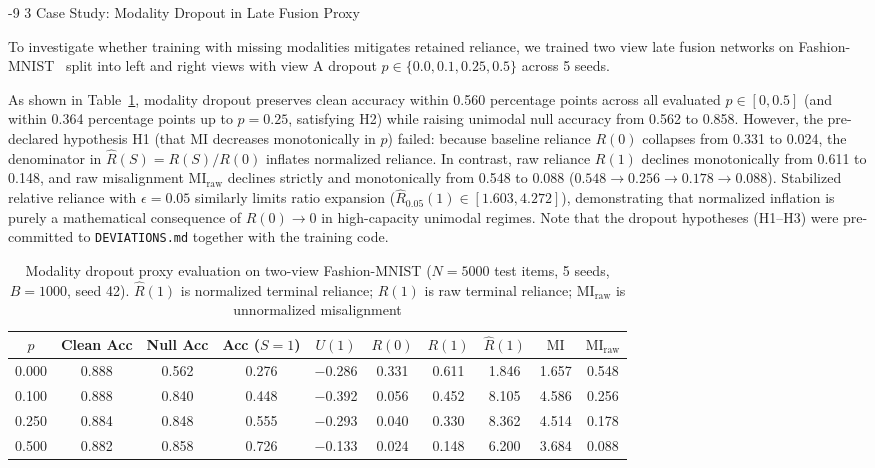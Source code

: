 \documentclass[graybox]{svmult}
\makeatletter
\newcommand{\mi}{\text{MI}}
\renewcommand\section{\@startsection{section}{1}{\z@}%
  {-9\p@ \@plus -2\p@ \@minus -1\p@}%
  {3\p@ \@plus 1\p@ \@minus 1\p@}%
  {\normalfont\large\bfseries\boldmath}}
\makeatother
\begin{document}
\section{Case Study: Modality Dropout in Late Fusion Proxy}
\label{sec:fusion}

To investigate whether training with missing modalities mitigates retained reliance, we trained two view late fusion networks on Fashion-MNIST~\cite{xiao2017fashion} split into left and right views with view A dropout $p \in \{0.0,0.1,0.25,0.5\}$ across 5 seeds.

As shown in Table~\ref{tab:fusion}, modality dropout preserves clean accuracy within 0.560 percentage points across all evaluated $p \in [0,0.5]$ (and within 0.364 percentage points up to $p = 0.25$, satisfying H2) while raising unimodal null accuracy from 0.562 to 0.858. However, the pre-declared hypothesis H1 (that $\mi$ decreases monotonically in $p$) failed: because baseline reliance $R(0)$ collapses from 0.331 to 0.024, the denominator in $\hat{R}(S) = R(S)/R(0)$ inflates normalized reliance. In contrast, raw reliance $R(1)$ declines monotonically from 0.611 to 0.148, and raw misalignment $\mi_{\text{raw}}$ declines strictly and monotonically from 0.548 to 0.088 ($0.548 \to 0.256 \to 0.178 \to 0.088$). Stabilized relative reliance with $\epsilon=0.05$ similarly limits ratio expansion ($\hat{R}_{0.05}(1) \in [1.603, 4.272]$), demonstrating that normalized inflation is purely a mathematical consequence of $R(0) \to 0$ in high-capacity unimodal regimes. Note that the dropout hypotheses (H1–H3) were pre-committed to \texttt{DEVIATIONS.md} together with the training code.

\begin{table}[tb]
\centering
\caption{Modality dropout proxy evaluation on two-view Fashion-MNIST ($N = 5000$ test items, 5 seeds, $B = 1000$, seed 42). $\hat{R}(1)$ is normalized terminal reliance; $R(1)$ is raw terminal reliance; $\mi_{\text{raw}}$ is unnormalized misalignment}
\label{tab:fusion}
{\footnotesize\setlength{\tabcolsep}{2.5pt}%
\begin{tabular}{cccccccccc}
\toprule
$p$ & Clean Acc & Null Acc & Acc ($S = 1$) & $U(1)$ & $R(0)$ & $R(1)$ & $\hat{R}(1)$ & $\mi$ & $\mi_{\text{raw}}$ \\
\midrule
0.000 & 0.888 & 0.562 & 0.276 & $-$0.286 & 0.331 & 0.611 & 1.846 & 1.657 & 0.548 \\
0.100 & 0.888 & 0.840 & 0.448 & $-$0.392 & 0.056 & 0.452 & 8.105 & 4.586 & 0.256 \\
0.250 & 0.884 & 0.848 & 0.555 & $-$0.293 & 0.040 & 0.330 & 8.362 & 4.514 & 0.178 \\
0.500 & 0.882 & 0.858 & 0.726 & $-$0.133 & 0.024 & 0.148 & 6.200 & 3.684 & 0.088 \\
\bottomrule
\end{tabular}}
\end{table}
\end{document}
